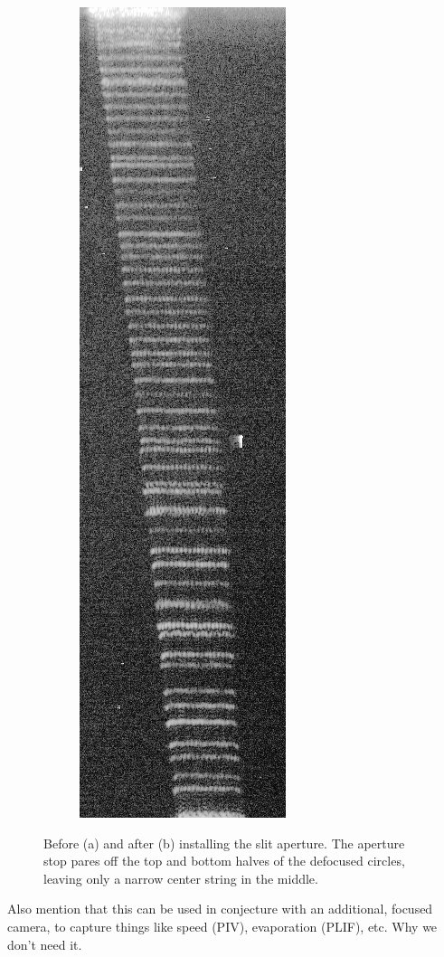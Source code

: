 \documentclass[11.5pt,oneside]{book}
\begin{document}
\begin{figure}[h!]
\begin{subfigure}[b]{0.4\textwidth}
        \includegraphics[height=0.6\textheight]{img/slitted.jpg}
        \caption{}
    \end{subfigure}
    \caption{Before (a) and after (b) installing the slit aperture. The aperture
    stop pares off the top and bottom halves of the defocused circles, leaving
only a narrow center string in the middle.}
    \label{fig:globalsizing}
\end{figure}
Also mention that this can be used in conjecture with an additional, focused
camera, to capture things like speed (PIV), evaporation (PLIF), etc. Why we
don't need it.
\end{document}
